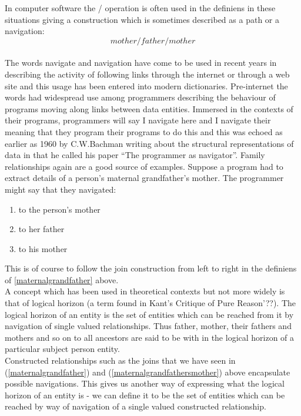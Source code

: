 \noindent In computer software the / operation is often used in the definiens in these situations giving a
 construction which is sometimes described as a path or a navigation:
 \\
\begin{equation}
mother/father/mother
\end{equation}
 \\
\noindent The words navigate and navigation have come to be used in recent years in describing the activity of 
following links through the internet or through a web site and this usage has been entered into modern dictionaries.
Pre-internet the words had widespread use among programmers describing the behaviour of programs moving along links 
between data entities. Immersed in the contexts of their programs, programmers will say I navigate here and I navigate their 
meaning that they program their programs to do this and this was echoed as earlier as 1960 by C.W.Bachman writing about the
structural representations of data in that he called his paper "`The programmer as navigator"'. Family relationships 
again are a good source of examples.
Suppose a program had to extract details of a person's maternal grandfather's mother. 
The programmer might say that they navigated:

\begin{enumerate}
	\item to the person's mother
	\item to her father
	\item to his mother
\end{enumerate}

\noindent This is of course to follow the join construction from left to right in the 
definiens of \ref{maternalgrandfather} above. \\

\noindent A concept which has been used in theoretical contexts but not more widely is that of 
logical horizon (a term found in Kant's Critique of Pure Reason'??). The logical horizon of an entity is 
the set of entities which can be reached from it by navigation of single valued relationships. Thus father,
mother, their fathers and mothers and so on to all ancestors are said to be with in the logical horizon of a 
particular subject person entity. \\

\noindent Constructed relationships such as the joins that we have seen in (\ref{maternalgrandfather}) and (\ref{maternalgrandfathersmother}) above encapsulate possible navigations. 
This gives us another way of expressing what the logical horizon of an entity is - we can define it to be the set of entities which 
can be reached by way of navigation of a single valued constructed relationship.\\

